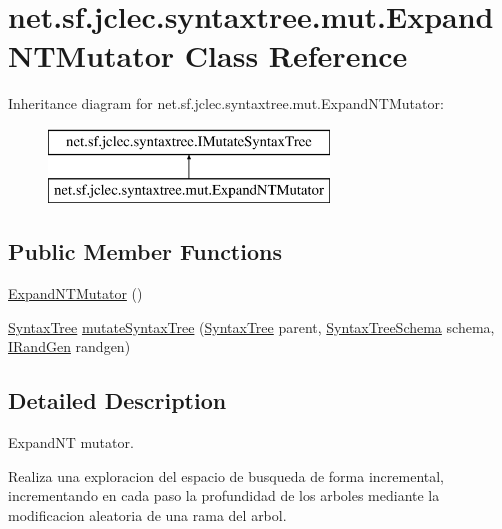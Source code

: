 \hypertarget{classnet_1_1sf_1_1jclec_1_1syntaxtree_1_1mut_1_1_expand_n_t_mutator}{\section{net.\-sf.\-jclec.\-syntaxtree.\-mut.\-Expand\-N\-T\-Mutator Class Reference}
\label{classnet_1_1sf_1_1jclec_1_1syntaxtree_1_1mut_1_1_expand_n_t_mutator}
}
Inheritance diagram for net.\-sf.\-jclec.\-syntaxtree.\-mut.\-Expand\-N\-T\-Mutator\-:\begin{figure}[H]
\begin{center}
\leavevmode
\includegraphics[height=2.000000cm]{classnet_1_1sf_1_1jclec_1_1syntaxtree_1_1mut_1_1_expand_n_t_mutator}
\end{center}
\end{figure}
\subsection*{Public Member Functions}
\begin{DoxyCompactItemize}
\item 
\hyperlink{classnet_1_1sf_1_1jclec_1_1syntaxtree_1_1mut_1_1_expand_n_t_mutator_a726057809fe6521937788448b41a80ae}{Expand\-N\-T\-Mutator} ()
\item 
\hyperlink{classnet_1_1sf_1_1jclec_1_1syntaxtree_1_1_syntax_tree}{Syntax\-Tree} \hyperlink{classnet_1_1sf_1_1jclec_1_1syntaxtree_1_1mut_1_1_expand_n_t_mutator_a1d141078f04df8fe00572b0dd6f484ed}{mutate\-Syntax\-Tree} (\hyperlink{classnet_1_1sf_1_1jclec_1_1syntaxtree_1_1_syntax_tree}{Syntax\-Tree} parent, \hyperlink{classnet_1_1sf_1_1jclec_1_1syntaxtree_1_1_syntax_tree_schema}{Syntax\-Tree\-Schema} schema, \hyperlink{interfacenet_1_1sf_1_1jclec_1_1util_1_1random_1_1_i_rand_gen}{I\-Rand\-Gen} randgen)
\end{DoxyCompactItemize}


\subsection{Detailed Description}
Expand\-N\-T mutator.

Realiza una exploracion del espacio de busqueda de forma incremental, incrementando en cada paso la profundidad de los arboles mediante la modificacion aleatoria de una rama del arbol.

